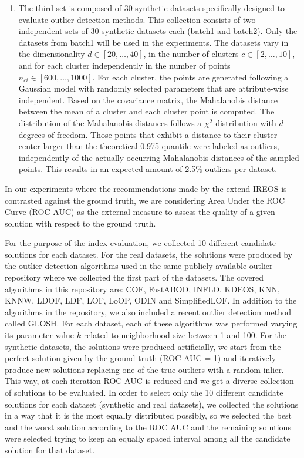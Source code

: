 \documentclass[11pt]{article}
\begin{document}
{\begin{enumerate}
	\item The third set is composed of 30 synthetic datasets specifically designed to evaluate outlier detection methods\cite{zimek2013}. This collection consists of two independent sets of 30 synthetic datasets each (batch1 and batch2). Only the datasets from batch1 will be used in the experiments. The datasets vary in the dimensionality $d \in [20, \dots, 40]$, in the number of clusters $c \in [2, \dots, 10]$, and for each cluster independently in the number of points $n_{ci} \in [600, \dots, 1000]$. For each cluster, the points are generated following a Gaussian model with randomly selected parameters that are attribute-wise independent. Based on the covariance matrix, the Mahalanobis distance between the mean of a cluster and each cluster point is computed. The distribution of the Mahalanobis distances follows a $\chi^2$ distribution with $d$ degrees of freedom. Those points that exhibit a distance to their cluster center larger than the theoretical 0.975 quantile were labeled as outliers, independently of the actually occurring Mahalanobis distances of the sampled points. This results in an expected amount of 2.5\% outliers per dataset. 
\end{enumerate}

In our experiments where the recommendations made by the extend IREOS is contrasted against the ground truth, we are considering Area Under the ROC Curve (ROC AUC) as the external measure to assess the quality of a given solution with respect to the ground truth.

For the purpose of the index evaluation, we collected 10 different candidate solutions for each dataset. For the real datasets, the solutions were produced by the outlier detection algorithms used in the same publicly available outlier repository where we collected the first part of the datasets\cite{campos2016}. The covered algorithms in this repository are: COF, FastABOD, INFLO, KDEOS, KNN, KNNW, LDOF, LDF, LOF, LoOP, ODIN and SimplifiedLOF. In addition to the algorithms in the repository, we also included a recent outlier detection method called GLOSH. For each dataset, each of these algorithms was performed varying its parameter value $k$ related to neighborhood size between 1 and 100. For the synthetic datasets, the solutions were produced artificially, we start from the perfect solution given by the ground truth (ROC AUC = 1) and iteratively produce new solutions replacing one of the true outliers with a random inlier. This way, at each iteration ROC AUC is reduced and we get a diverse collection of solutions to be evaluated. In order to select only the 10 different candidate solutions for each dataset (synthetic and real datasets), we collected the solutions in a way that it is the most equally distributed possibly, so we selected the best and the worst solution according to the ROC AUC and the remaining solutions were selected trying to keep an equally spaced interval among all the candidate solution for that dataset.

}
\end{document}

